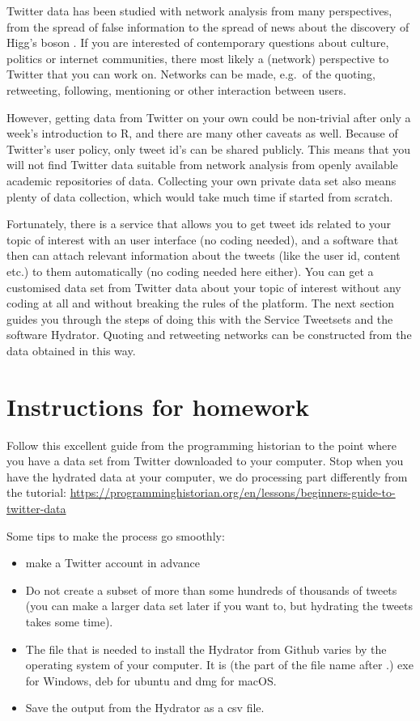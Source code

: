\documentclass[
]{book}
\providecommand{\tightlist}{%
  \setlength{\itemsep}{0pt}\setlength{\parskip}{0pt}}
\begin{document}
Twitter data has been studied with network analysis from many perspectives, from the spread of false information \citep{Shahi2021} to the spread of news about the discovery of Higg's boson \citep{Domenico2013}. If you are interested of contemporary questions about culture, politics or internet communities, there most likely a (network) perspective to Twitter that you can work on. Networks can be made, e.g.~of the quoting, retweeting, following, mentioning or other interaction between users.

However, getting data from Twitter on your own could be non-trivial after only a week's introduction to R, and there are many other caveats as well. Because of Twitter's user policy, only tweet id's can be shared publicly. This means that you will not find Twitter data suitable from network analysis from openly available academic repositories of data. Collecting your own private data set also means plenty of data collection, which would take much time if started from scratch.

Fortunately, there is a service that allows you to get tweet ids related to your topic of interest with an user interface (no coding needed), and a software that then can attach relevant information about the tweets (like the user id, content etc.) to them automatically (no coding needed here either). You can get a customised data set from Twitter data about
your topic of interest without any coding at all and without breaking the rules of the platform. The next section guides you through the steps of doing this with the Service Tweetsets and the software Hydrator. Quoting and retweeting networks can be constructed from the data obtained in this way.

\hypertarget{instructions-for-homework}{%
\section{Instructions for homework}\label{instructions-for-homework}}

Follow this excellent guide from the programming historian to the point where you have a data set from Twitter downloaded to your computer.
Stop when you have the hydrated data at your computer, we do processing part differently from the tutorial:
\url{https://programminghistorian.org/en/lessons/beginners-guide-to-twitter-data}

Some tips to make the process go smoothly:

\begin{itemize}
\tightlist
\item
  make a Twitter account in advance
\item
  Do not create a subset of more than some hundreds of thousands of tweets (you can make a larger data set later if you want to, but hydrating the tweets takes some time).
\item
  The file that is needed to install the Hydrator from Github varies by the operating system of your computer. It is (the part of the file name after .) exe for Windows, deb for ubuntu and dmg for macOS.
\item
  Save the output from the Hydrator as a csv file.
\end{itemize}
\end{document}
